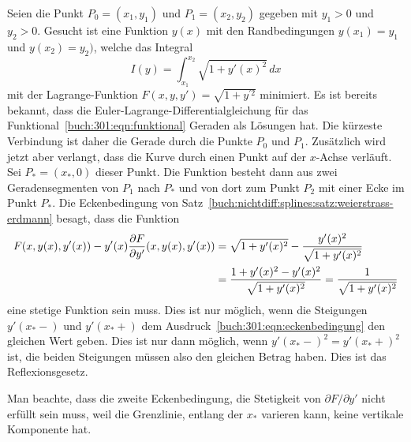\begin{loesung}
Seien die Punkt $P_0=(x_1,y_1)$ und $P_1=(x_2,y_2)$ gegeben mit $y_1>0$
und $y_2>0$.
Gesucht ist eine Funktion $y(x)$ mit den Randbedingungen $y(x_1)=y_1$
und $y(x_2)=y_2)$, welche das Integral
\begin{equation}
I(y)
=
\int_{x_1}^{x_2} \sqrt{1+y'(x)^2}\,dx
\label{buch:301:eqn:funktional}
\end{equation}
mit der Lagrange-Funktion $F(x,y,y') = \sqrt{1+y^{\prime 2}}$
minimiert.
Es ist bereits bekannt, dass die Euler-Lagrange-Differentialgleichung
für das Funktional~\eqref{buch:301:eqn:funktional} Geraden als
Lösungen hat.
Die kürzeste Verbindung ist daher die Gerade durch die Punkte $P_0$ und
$P_1$.
Zusätzlich wird jetzt aber verlangt, dass die Kurve durch einen Punkt
auf der $x$-Achse verläuft.
Sei $P_*=(x_*,0)$ dieser Punkt.
Die Funktion besteht dann aus zwei Geradensegmenten von $P_1$ nach
$P_*$ und von dort zum Punkt $P_2$ mit einer Ecke im Punkt $P_*$.
Die Eckenbedingung von
Satz~\ref{buch:nichtdiff:splines:satz:weierstrass-erdmann}
besagt, dass  die Funktion
\begin{align}
F(x,y(x),y'(x))
-
y'(x)
\frac{\partial F}{\partial y'}
(x,y(x),y'(x))
&=
\sqrt{1+y'(x)^2}
-
\frac{y'(x)^2}{\sqrt{1+y'(x)^2}}
\notag
\\
&=
\frac{1+y'(x)^2-y'(x)^2}{\sqrt{1+y'(x)^2}}
=
\frac{1}{\sqrt{1+y'(x)^2}}
\label{buch:301:eqn:eckenbedingung}
\end{align}
eine stetige Funktion sein muss.
Dies ist nur möglich, wenn die Steigungen $y'(x_*-)$ und $y'(x_*+)$ dem
Ausdruck~\eqref{buch:301:eqn:eckenbedingung} den gleichen Wert geben.
Dies ist nur dann möglich, wenn $y'(x_*-)^2=y'(x_*+)^2$ ist, die
beiden Steigungen müssen also den gleichen Betrag haben.
Dies ist das Reflexionsgesetz.

Man beachte, dass die zweite Eckenbedingung, die Stetigkeit von
$\partial F/\partial y'$ nicht erfüllt sein muss, weil die Grenzlinie,
entlang der $x_*$ varieren kann, keine vertikale Komponente hat.
\end{loesung}



